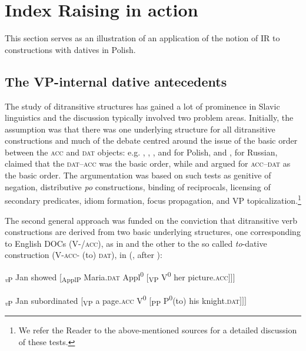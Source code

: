\documentclass[output=paper,modfonts,nonflat
]{langsci/langscibook}
\begin{document}
\section{Index Raising in action}\label{sec:witkos:s3}

This section serves as an illustration of an application of the notion of IR to constructions with datives in Polish.   

\subsection{The VP-internal dative antecedents}\label{s3.1}

The study of ditransitive structures has gained a lot of prominence in Slavic linguistics and the discussion typically involved two problem areas. Initially, the assumption was that there was one underlying structure for all ditransitive constructions and much of the debate  centred around the issue of the basic order between the \textsc{acc} and \textsc{dat} objects: e.g. \citet{willim1989}, \citet{witkos1998,witkos2007,witkos2008}, \citet{tajsner2008}, and \cite{citko2011} for Polish, and \citet{franks1995}, \citet{dyakonova2007,dyakonova2009} for Russian, claimed that the \textsc{dat}--\textsc{acc} was the basic order, while \citet{bailyn1996,bailyn2010,bailyn2012} and \cite{antonyuk2015} argued for \textsc{acc}--\textsc{dat} as the basic order. The argumentation was based on such tests as genitive of negation, distributive \textit{po} constructions, binding of reciprocals, licensing of secondary predicates, idiom formation, focus propagation, and VP topicalization.\footnote{\label{fn18}We refer the Reader to the above-mentioned sources for a detailed discussion of these tests.}

\largerpage[2]
The second general approach was funded on the conviction that ditransitive verb constructions are derived from two basic underlying structures, one corresponding to English DOCs (V-/\textsc{acc}), as in  and the other to the so called \textit{to}-dative construction (V-\textsc{acc}- (to) \textsc{dat}), in (, after \cite{dvorak2010}): 

\ea  \label{ex:witkos:21} \minsp{[} \textsubscript{\textit{v}P} Jan showed [\textsubscript{ApplP} Maria.\textsc{dat} Appl\textsuperscript{0} [\textsubscript{VP} V\textsuperscript{0} her picture.\textsc{acc}$]]]$\\
\z

\ea  \label{ex:witkos:22} \minsp{[} \textsubscript{\textit{v}P} Jan subordinated [\textsubscript{VP} a page.\textsc{acc} V\textsuperscript{0} [\textsubscript{PP} P\textsuperscript{0}(to) his knight.\textsc{dat}$]]]$\\
\z
\end{document}
